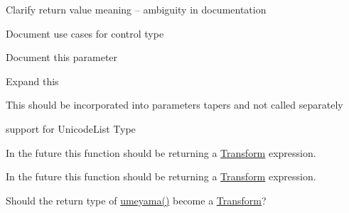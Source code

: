 \begin{DoxyRefList}
%
Clarify return value meaning -- ambiguity in documentation 
\item[Member \mbox{\hyperlink{class_a_a_x___i_parameter_a0c096b4092b2146d9aa0413bceeaac48}{A\+A\+X\+\_\+\+I\+Parameter::Get\+Type}} () const =0]\label{todo__todo000051}%
%
Document use cases for control type  
\item[Member \mbox{\hyperlink{class_a_a_x___i_parameter_a809a5c7f712ed2e5c55e30b6d5557c59}{A\+A\+X\+\_\+\+I\+Parameter::Set\+Taper\+Delegate}} (\mbox{\hyperlink{class_a_a_x___i_taper_delegate_base}{A\+A\+X\+\_\+\+I\+Taper\+Delegate\+Base}} \&in\+Taper\+Delegate, bool in\+Preserve\+Value)=0]\label{todo__todo000052}%
%
Document this parameter  
\item[Page \mbox{\hyperlink{md__c_1__users_fab_src__github_branches__neural_amp_modeler_plugin_i_plug2__documentation_codingstyle}{Code Style}} ]\label{todo__todo000063}%
%
Expand this 
\item[Member \mbox{\hyperlink{_a_a_x___common_conversions_8h_a596d5ea393d43f6f798a838aefe3cecd}{D\+B\+To\+Gain}} (double dB)]\label{todo__todo000019}%
%
This should be incorporated into parameters\textquotesingle{} tapers and not called separately  
\item[Member \mbox{\hyperlink{acfuids_8h_a57ae97c8580db5d25ed912a7e31566d7}{D\+E\+F\+I\+N\+E\+\_\+\+A\+C\+F\+U\+ID}} (acf\+U\+ID, A\+C\+F\+Type\+I\+D\+\_\+\+Unicode\+List, 0x10\+B\+C\+D509, 0x7972, 0x11\+D6, 0x\+A3, 0x\+A2, 0x00, 0x30, 0x65, 0x42, 0x\+A0, 0x24)]\label{todo__todo000053}%
%
support for Unicode\+List Type  
\item[Member \mbox{\hyperlink{class_eigen_1_1_transform_a62fc34fbc47a39c0d77598fff602e762}{Eigen::Transform::Identity}} ()]\label{todo__todo000250}%
%
In the future this function should be returning a \mbox{\hyperlink{class_eigen_1_1_transform}{Transform}} expression. 

\label{todo__todo000253}%
%
In the future this function should be returning a \mbox{\hyperlink{class_eigen_1_1_transform}{Transform}} expression.  
\item[Member \mbox{\hyperlink{group___geometry___module_ga033d6550c1fc82e232f2b4c380c19a54}{Eigen::umeyama}} (const Matrix\+Base$<$ Derived $>$ \&src, const Matrix\+Base$<$ Other\+Derived $>$ \&dst, bool with\+\_\+scaling=true)]\label{todo__todo000251}%
%
Should the return type of \mbox{\hyperlink{group___geometry___module_ga033d6550c1fc82e232f2b4c380c19a54}{umeyama()}} become a \mbox{\hyperlink{class_eigen_1_1_transform}{Transform}}?


\end{DoxyRefList}
